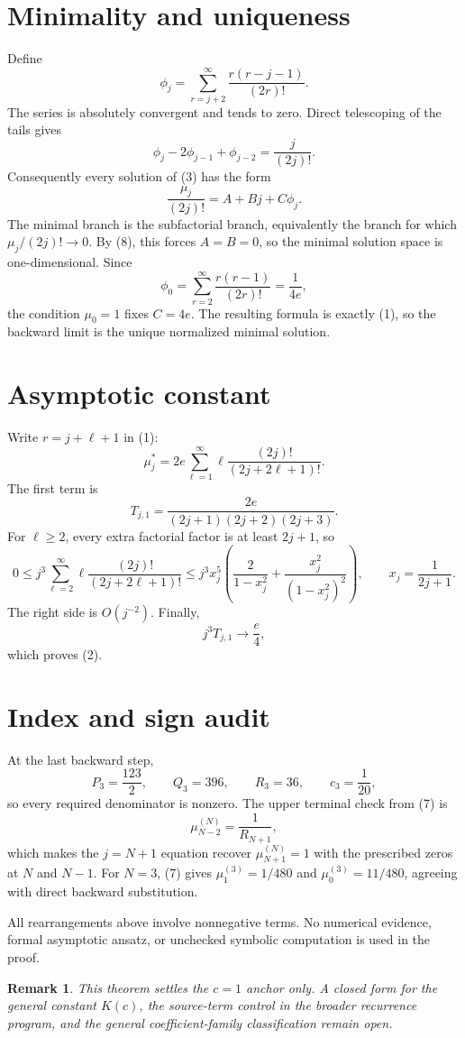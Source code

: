 \documentclass[11pt]{article}
\newtheorem{remark}[theorem]{Remark}
\begin{document}
\section{Minimality and uniqueness}

Define
\[
\phi_j=\sum_{r=j+2}^{\infty}
\frac{r(r-j-1)}{(2r)!}.
\]
The series is absolutely convergent and tends to zero.  Direct telescoping of
the tails gives
\[
\phi_j-2\phi_{j-1}+\phi_{j-2}=\frac{j}{(2j)!}.
\]
Consequently every solution of (3) has the form
\begin{equation}
\frac{\mu_j}{(2j)!}=A+Bj+C\phi_j.
\tag{8}
\end{equation}
The minimal branch is the subfactorial branch, equivalently the branch for
which \(\mu_j/(2j)!\to 0\).  By (8), this forces \(A=B=0\), so the minimal
solution space is one-dimensional.  Since
\[
\phi_0=\sum_{r=2}^{\infty}\frac{r(r-1)}{(2r)!}=\frac{1}{4e},
\]
the condition \(\mu_0=1\) fixes \(C=4e\).  The resulting formula is exactly
(1), so the backward limit is the unique normalized minimal solution.

\section{Asymptotic constant}

Write \(r=j+\ell+1\) in (1):
\begin{equation}
\mu_j^*=2e\sum_{\ell=1}^{\infty}
\ell\frac{(2j)!}{(2j+2\ell+1)!}.
\tag{9}
\end{equation}
The first term is
\[
T_{j,1}=\frac{2e}{(2j+1)(2j+2)(2j+3)}.
\]
For \(\ell\geq 2\), every extra factorial factor is at least \(2j+1\), so
\[
0\leq j^3\sum_{\ell=2}^{\infty}
\ell\frac{(2j)!}{(2j+2\ell+1)!}
\leq j^3x_j^5
\left(\frac{2}{1-x_j^2}+
\frac{x_j^2}{(1-x_j^2)^2}\right),
\qquad x_j=\frac{1}{2j+1}.
\]
The right side is \(O(j^{-2})\).  Finally,
\[
j^3T_{j,1}\longrightarrow \frac{e}{4},
\]
which proves (2).

\section{Index and sign audit}

At the last backward step,
\[
P_3=\frac{123}{2},\qquad Q_3=396,\qquad R_3=36,
\qquad c_3=\frac1{20},
\]
so every required denominator is nonzero.  The upper terminal check from (7)
is
\[
\mu_{N-2}^{(N)}=\frac{1}{R_{N+1}},
\]
which makes the \(j=N+1\) equation recover \(\mu_{N+1}^{(N)}=1\) with the
prescribed zeros at \(N\) and \(N-1\).  For \(N=3\), (7) gives
\(\mu_1^{(3)}=1/480\) and \(\mu_0^{(3)}=11/480\), agreeing with direct
backward substitution.

All rearrangements above involve nonnegative terms.  No numerical evidence,
formal asymptotic ansatz, or unchecked symbolic computation is used in the
proof.

\begin{remark}
This theorem settles the \(c=1\) anchor only.  A closed form for the general
constant \(K(c)\), the source-term control in the broader recurrence program,
and the general coefficient-family classification remain open.
\end{remark}
\end{document}
